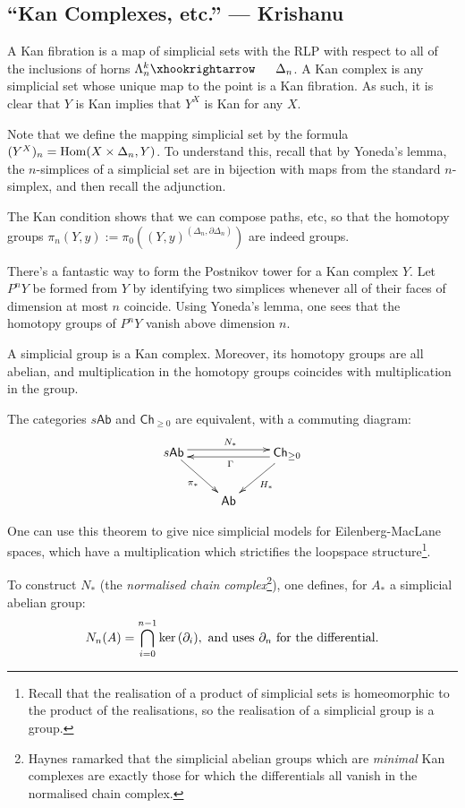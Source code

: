\documentclass[11pt]{article}
\newcommand{\KanSemResponse}[1]
{
\thispagestyle{fancy}
\subsection*{#1}
}
\begin{document}
\begin{KrishanuKanComplexes}
\KanSemResponse
{``Kan Complexes, etc.'' --- Krishanu}
A Kan fibration is a map of simplicial sets with the RLP with respect to all of the inclusions of horns $\Lambda_n^k\cofibration \Delta_n$. A Kan complex is any simplicial set whose unique map to the point is a Kan fibration. As such, it is clear that $Y$ is Kan implies that $Y^X$ is Kan for any $X$.

Note that we define the mapping simplicial set by the formula $(Y^X)_n=\Hom(X\times\Delta_n,Y)$. To understand this, recall that by Yoneda's lemma, the $n$-simplices of a simplicial set are in bijection with maps from the standard $n$-simplex, and then recall the adjunction.

The Kan condition shows that we can compose paths, etc, so that the homotopy groups $\pi_n(Y,y):=\pi_0((Y,y)^{(\Delta_n,\partial\Delta_n)})$ are indeed groups.

There's a fantastic way to form the Postnikov tower for a Kan complex $Y$. Let $P^n Y$ be formed from $Y$ by identifying two simplices whenever all of their faces of dimension at most $n$ coincide. Using Yoneda's lemma, one sees that the homotopy groups of $P^nY$ vanish above dimension $n$.

\begin{prop*}
A simplicial group is a Kan complex. Moreover, its homotopy groups are all abelian, and multiplication in the homotopy groups coincides with multiplication in the group.
\end{prop*}
\begin{thm*}
The categories $s\mathsf{Ab}$ and $\mathsf{Ch}_{\geq0}$ are equivalent, with a commuting diagram:
\[\xymatrix{
\ar[rd]_{\pi_*}s\mathsf{Ab}\ar@<.1cm>[rr]^{N_*}&&
\mathsf{Ch}_{\geq0}\ar@<1mm>[ll]^\Gamma\ar[ld]^{H_*}\\
&\mathsf{Ab}
}\]
\end{thm*}
\noindent One can use this theorem to give nice simplicial models for Eilenberg-MacLane spaces, which have a multiplication which strictifies the loopspace structure\footnote{Recall that the realisation of a product of simplicial sets is homeomorphic to the product of the realisations, so the realisation of a simplicial group is a group.}.

To construct $N_*$ (the \emph{normalised chain complex}\footnote{Haynes ramarked that the simplicial abelian groups which are \emph{minimal} Kan complexes are exactly those for which the differentials all vanish in the normalised chain complex.}), one defines, for $A_*$ a simplicial abelian group:
\[N_n(A)=\bigcap_{i=0}^{n-1}\ker(\partial_i),\textup{ and uses $\partial_n$ for the differential.}\]


\pagebreak
\end{KrishanuKanComplexes}
\end{document}

